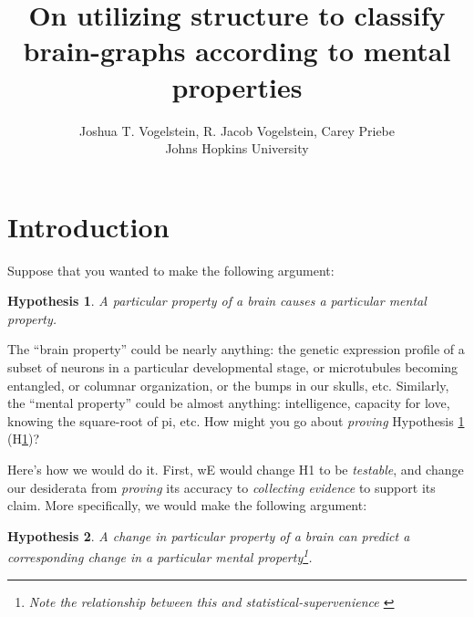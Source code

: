  
\usepackage{algorithmic} 
\usepackage{algorithm}

\newtheorem{goal}{Goal} 
\newtheorem{desid}{Desiderata} 
\newtheorem{hypo}{Hypothesis} 
\newcommand{\zz}{\mathbb{Z}} 
\newcommand{\nec}{NeCoG}
\newcommand{\MeB}{\mM \overset{\varepsilon}{{\sim}}_F \mB}

 

\title{On utilizing structure to classify brain-graphs according to mental properties}

\author{Joshua T. Vogelstein, R. Jacob Vogelstein, Carey Priebe\\{Johns Hopkins University}}



\maketitle
\begin{abstract}
\end{abstract}

\section{Introduction} 

\label{sec:introduction}

Suppose that you wanted to make the following argument: 
\begin{hypo}
	\label{h1} A particular property of a brain causes a particular mental property. 
\end{hypo}

The ``brain property'' could be nearly anything: the genetic expression profile of a subset of neurons in a particular developmental stage, or microtubules becoming entangled, or columnar organization, or the bumps in our skulls, etc. Similarly, the ``mental property'' could be almost anything: intelligence, capacity for love, knowing the square-root of pi, etc. How might you go about \emph{proving} Hypothesis \ref{h1} (H\ref{h1})?

Here's how we would do it. First, wE would change H1 to be \emph{testable}, and change our desiderata from \emph{proving} its accuracy to \emph{collecting evidence} to support its claim. More specifically, we would make the following argument:
\begin{hypo}
	\label{h2} A change in particular property of a brain can predict a corresponding change in a particular mental property\footnote{Note the relationship between this and \emph{statistical-supervenience} \cite{VogelsteinPriebe10}}. 
\end{hypo}

